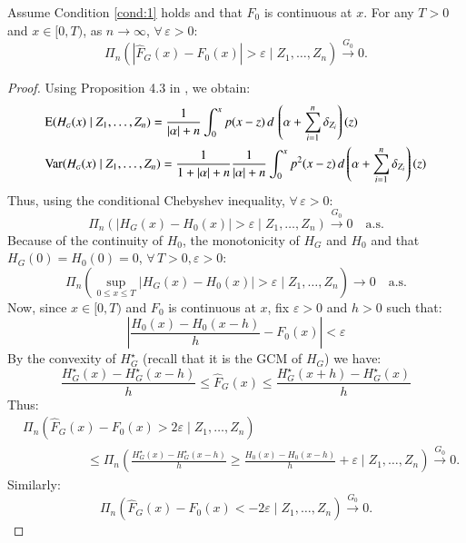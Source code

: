 \begin{lemma}\label{lemma: consistency chapter4}
	Assume Condition \ref{cond:1} holds and that $F_0$ is continuous at $x$. For any $T > 0$ and $x \in [0, T)$, as $n \rightarrow \infty$, $\forall \, \varepsilon > 0$:
	\[ \Pi_n ( |\hat{F}_{\scriptscriptstyle{G}}(x) - F_0(x)| > \varepsilon \mid Z_1, \dots, Z_n ) \xrightarrow{G_0} 0. \]
\end{lemma}
\begin{proof}
Using Proposition 4.3 in \cite{4}, we obtain:
\begin{align*} 
	&\mathrm{E} (H_{\scriptscriptstyle{G}}(x) \mid Z_1, \dots, Z_n) = \frac{1}{|\alpha|+n} \int_0^{x} p(x-z) \, d \, \left(\alpha + \sum_{i=1}^n \delta_{Z_i}\right)(z) \\
	&\mathrm{Var}(H_{\scriptscriptstyle{G}} (x) \mid Z_1, \dots, Z_n) = \frac{1}{1+|\alpha|+n} \frac{1}{|\alpha|+n} \int_0^{x} p^2(x-z) \, d\left(\alpha + \sum_{i=1}^n \delta_{Z_i}\right)(z) 
\end{align*}
Thus, using the conditional Chebyshev inequality, $\forall \, \varepsilon > 0$:
\[ \Pi_n ( |H_{\scriptscriptstyle{G}}(x) - H_0(x)| > \varepsilon \mid Z_1, \dots, Z_n ) \stackrel{G_0}{\to} 0 \quad \text{a.s.} \]
Because of the continuity of $H_0$, the monotonicity of $H_{\scriptscriptstyle{G}}$ and $H_0$ and that $H_{\scriptscriptstyle{G}}(0) = H_0(0) = 0$, $\forall \, T > 0, \varepsilon > 0$:
\[ \Pi_n \left( \sup_{0 \leq x \leq T} |H_{\scriptscriptstyle{G}} (x) - H_0(x)| > \varepsilon \mid Z_1, \dots, Z_n \right) \to 0 \quad \text{a.s.} \]
Now, since $x \in [0, T)$ and $F_0$ is continuous at $x$, fix $\varepsilon > 0$ and $h > 0$ such that:
\[ \left| \frac{H_0(x) - H_0(x-h)}{h} - F_0(x) \right| < \varepsilon \]
By the convexity of $H_{\scriptscriptstyle{G}}^{\star}$ (recall that it is the GCM of $H_{\scriptscriptstyle{G}}$) we have:
\[ \frac{H_{\scriptscriptstyle{G}}^{\star}(x) - H_{\scriptscriptstyle{G}}^{\star}(x-h)}{h} \le \hat{F}_{\scriptscriptstyle{G}}(x) \le \frac{H_{\scriptscriptstyle{G}}^{\star}(x+h) - H_{\scriptscriptstyle{G}}^{\star}(x)}{h} \]
Thus:
\begin{align*}
&\Pi_n ( \hat{F}_{\scriptscriptstyle{G}} (x) - F_0(x) > 2\varepsilon \mid Z_1, \dots, Z_n ) \\
&\quad \quad \quad \quad  \quad \le \Pi_n \left( \frac{H_{\scriptscriptstyle{G}}^{\star}(x) - H_{\scriptscriptstyle{G}}^{\star}(x-h)}{h} \ge \frac{H_0(x) - H_0(x-h)}{h} + \varepsilon \mid Z_1, \dots, Z_n \right) \xrightarrow{G_0} 0. 
\end{align*}
Similarly:
\[ \Pi_n ( \hat{F}_{\scriptscriptstyle{G}}(x) - F_0(x) < -2\varepsilon \mid Z_1, \dots, Z_n ) \xrightarrow{G_0} 0. \]
\end{proof}

